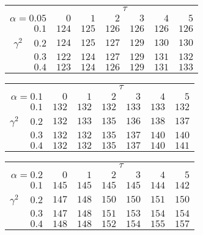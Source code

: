 \begin{tabular}{r|rrrrrr}
\hline\hline
 &\multicolumn{6}{c}{$\tau$} \\ 
 $\alpha = 0.05$ & $0$ & $1$ & $2$ & $3$ & $4$ & $5$ \\ 
 \hline$0.1$ & $124$ & $125$ & $126$ & $126$ & $126$ & $126$\\ 
$\gamma^2\;\;\;$ $0.2$ & $124$ & $125$ & $127$ & $129$ & $130$ & $130$\\ 
$0.3$ & $122$ & $124$ & $127$ & $129$ & $131$ & $132$\\ 
$0.4$ & $123$ & $124$ & $126$ & $129$ & $131$ & $133$\\ 
 \hline 
 \end{tabular}
 
 \vspace{2em} 
 
\begin{tabular}{r|rrrrrr}
\hline\hline
 &\multicolumn{6}{c}{$\tau$} \\ 
 $\alpha = 0.1$ & $0$ & $1$ & $2$ & $3$ & $4$ & $5$ \\ 
 \hline$0.1$ & $132$ & $132$ & $132$ & $133$ & $133$ & $132$\\ 
$\gamma^2\;\;\;$ $0.2$ & $132$ & $133$ & $135$ & $136$ & $138$ & $137$\\ 
$0.3$ & $132$ & $132$ & $135$ & $137$ & $140$ & $140$\\ 
$0.4$ & $132$ & $132$ & $135$ & $137$ & $140$ & $141$\\ 
 \hline 
 \end{tabular}
 
 \vspace{2em} 
 
\begin{tabular}{r|rrrrrr}
\hline\hline
 &\multicolumn{6}{c}{$\tau$} \\ 
 $\alpha = 0.2$ & $0$ & $1$ & $2$ & $3$ & $4$ & $5$ \\ 
 \hline$0.1$ & $145$ & $145$ & $145$ & $145$ & $144$ & $142$\\ 
$\gamma^2\;\;\;$ $0.2$ & $147$ & $148$ & $150$ & $150$ & $151$ & $150$\\ 
$0.3$ & $147$ & $148$ & $151$ & $153$ & $154$ & $154$\\ 
$0.4$ & $148$ & $148$ & $152$ & $154$ & $155$ & $157$\\ 
 \hline 
 \end{tabular}